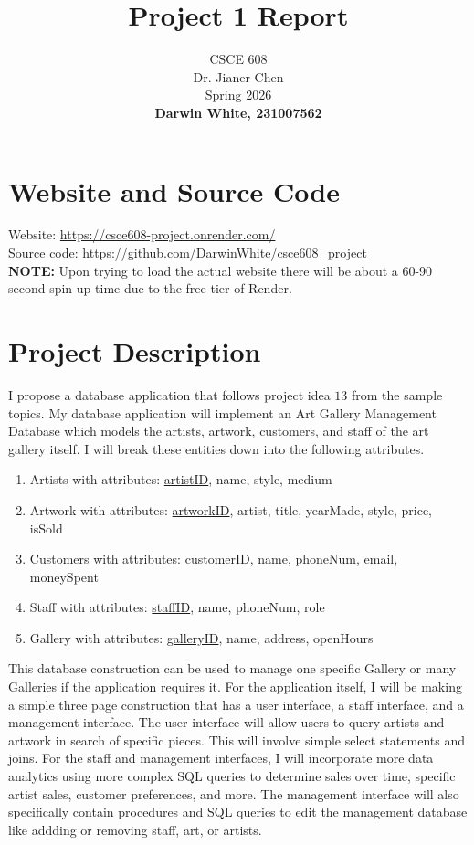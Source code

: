 \documentclass[12pt]{article}
\title{Project 1 Report}
\author{CSCE 608 \\ Dr. Jianer Chen \\ Spring 2026 \\ \vspace{0.5cm} \textbf{Darwin White, 231007562}}
\date{}
\begin{document}
\maketitle
\thispagestyle{fancy}

\section*{Website and Source Code}

Website: \href{https://csce608-project.onrender.com/}{https://csce608-project.onrender.com/}\\
Source code: \href{https://github.com/DarwinWhite/csce608_project}{https://github.com/DarwinWhite/csce608\_project}\\
\textbf{NOTE:} Upon trying to load the actual website there will be about a 60-90 second spin up time due to the free tier of Render.

\section*{Project Description}

I propose a database application that follows project idea $13$ from the sample topics. My database application will implement an Art Gallery Management Database which models the artists, artwork, customers, and staff of the art gallery itself. I will break these entities down into the following attributes.

\begin{enumerate}
    \item Artists with attributes: \underline{artistID}, name, style, medium
    \item Artwork with attributes: \underline{artworkID}, artist, title, yearMade, style, price, isSold
    \item Customers with attributes: \underline{customerID}, name, phoneNum, email, moneySpent
    \item Staff with  attributes: \underline{staffID}, name, phoneNum, role
    \item Gallery with attributes: \underline{galleryID}, name, address, openHours
\end{enumerate}

This database construction can be used to manage one specific Gallery or many Galleries if the application requires it. For the application itself, I will be making a simple three page construction that has a user interface, a staff interface, and a management interface. The user interface will allow users to query artists and artwork in search of specific pieces. This will involve simple select statements and joins. For the staff and management interfaces, I will incorporate more data analytics using more complex SQL queries to determine sales over time, specific artist sales, customer preferences, and more. The management interface will also specifically contain procedures and SQL queries to edit the management database like addding or removing staff, art, or artists.
\end{document}
